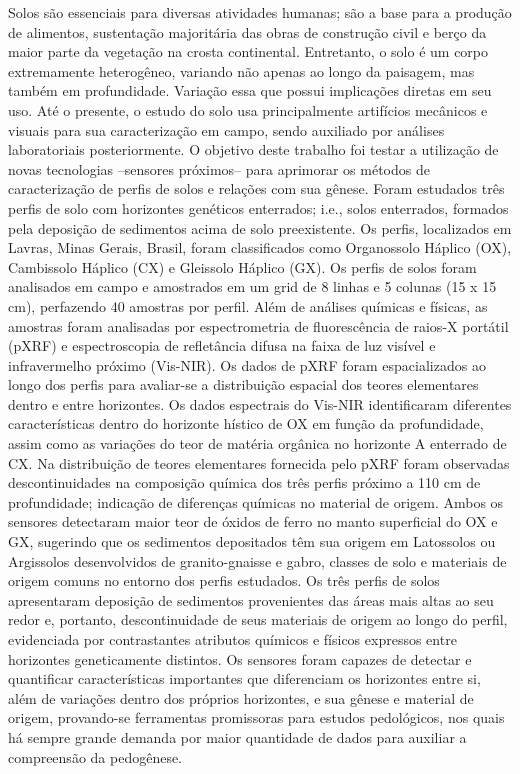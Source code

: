 Solos são essenciais para diversas atividades humanas; são a base para a
produção de alimentos, sustentação majoritária das obras de construção civil e
berço da maior parte da vegetação na crosta continental. Entretanto, o solo é um
corpo extremamente heterogêneo, variando não apenas ao longo da paisagem, mas
também em profundidade. Variação essa que possui implicações diretas em seu uso.
Até o presente, o estudo do solo usa principalmente artifícios mecânicos e
visuais para sua caracterização em campo, sendo auxiliado por análises
laboratoriais posteriormente. O objetivo deste trabalho foi testar a utilização
de novas tecnologias –sensores próximos– para aprimorar os métodos de
caracterização de perfis de solos e relações com sua gênese. Foram estudados
três perfis de solo com horizontes genéticos enterrados; i.e., solos
enterrados, formados pela deposição de sedimentos acima de solo preexistente. Os
perfis, localizados em Lavras, Minas Gerais, Brasil, foram classificados como
Organossolo Háplico (OX), Cambissolo Háplico (CX) e Gleissolo Háplico (GX). Os
perfis de solos foram analisados em campo e amostrados em um grid de 8 linhas
e 5 colunas (15 x 15 cm), perfazendo 40 amostras por perfil. Além de análises
químicas e físicas, as amostras foram analisadas por espectrometria de
fluorescência de raios-X portátil (pXRF) e espectroscopia de refletância difusa
na faixa de luz visível e infravermelho próximo (Vis-NIR). Os dados de pXRF
foram espacializados ao longo dos perfis para avaliar-se a distribuição espacial
dos teores elementares dentro e entre horizontes. Os dados espectrais do Vis-NIR
identificaram diferentes características dentro do horizonte hístico de OX em
função da profundidade, assim como as variações do teor de matéria orgânica no
horizonte A enterrado de CX. Na distribuição de teores elementares fornecida
pelo pXRF foram observadas descontinuidades na composição química dos três
perfis próximo a 110 cm de profundidade; indicação de diferenças químicas no
material de origem. Ambos os sensores detectaram maior teor de óxidos de ferro
no manto superficial do OX e GX, sugerindo que os sedimentos depositados têm sua
origem em Latossolos ou Argissolos desenvolvidos de granito-gnaisse e gabro,
classes de solo e materiais de origem comuns no entorno dos perfis estudados. Os
três perfis de solos apresentaram deposição de sedimentos provenientes das áreas
mais altas ao seu redor e, portanto, descontinuidade de seus materiais de origem
ao longo do perfil, evidenciada por contrastantes atributos químicos e físicos
expressos entre horizontes geneticamente distintos. Os sensores foram capazes de
detectar e quantificar características importantes que diferenciam os horizontes
entre si, além de variações dentro dos próprios horizontes, e sua gênese e
material de origem, provando-se ferramentas promissoras para estudos
pedológicos, nos quais há sempre grande demanda por maior quantidade de dados
para auxiliar a compreensão da pedogênese.